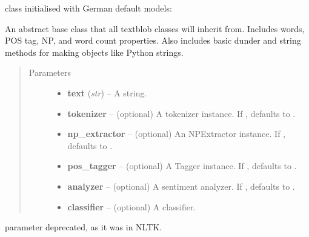 \documentclass[letterpaper,10pt,english]{sphinxmanual}
\begin{document}
\begin{fulllineitems}
\label{api_reference:textblob_de.blob.BaseBlob}
 class initialised with German default models:

An abstract base class that all textblob classes will inherit from.
Includes words, POS tag, NP, and word count properties. Also includes
basic dunder and string methods for making objects like Python strings.
\begin{quote}\begin{description}
\item[{Parameters}] \leavevmode\begin{itemize}
\item {} 
\textbf{text} (\emph{str}) -- A string.

\item {} 
\textbf{tokenizer} -- (optional) A tokenizer instance. If , defaults to
{\hyperref[api_reference:textblob_de.tokenizers.NLTKPunktTokenizer]{}}.

\item {} 
\textbf{np\_extractor} -- (optional) An NPExtractor instance. If ,
defaults to {\hyperref[api_reference:textblob_de.np_extractors.PatternParserNPExtractor]{}}.

\item {} 
\textbf{pos\_tagger} -- (optional) A Tagger instance. If , defaults to
{\hyperref[api_reference:textblob_de.taggers.PatternTagger]{}}.

\item {} 
\textbf{analyzer} -- (optional) A sentiment analyzer. If , defaults to
{\hyperref[api_reference:textblob_de.sentiments.PatternAnalyzer]{}}.

\item {} 
\textbf{classifier} -- (optional) A classifier.

\end{itemize}

\end{description}\end{quote}

 parameter deprecated, as it was in NLTK.


\end{fulllineitems}
\end{document}
